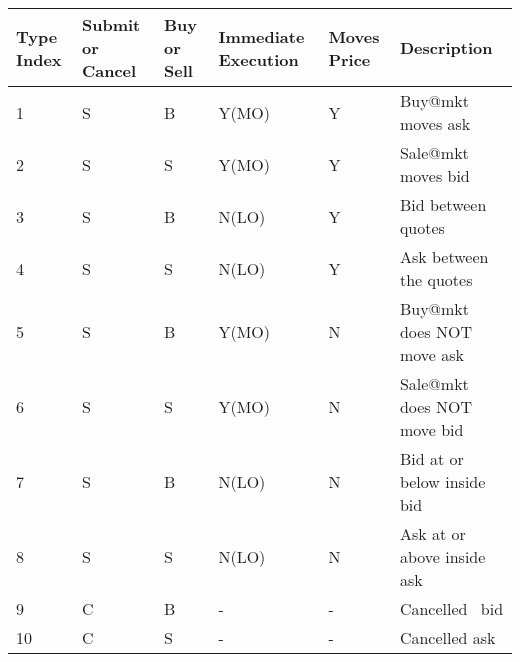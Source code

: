 \documentclass{article}
\begin{document}
\begin{tabular}{|l|l|l|l|l|l|}
  \hline
  Type Index & Submit or Cancel & Buy or Sell & Immediate Execution & Moves
  Price & Description\\
  \hline
  1 & S & B & Y(MO) & Y & Buy@mkt moves ask\\
  \hline
  2 & S & S & Y(MO) & Y & Sale@mkt moves bid\\
  \hline
  3 & S & B & N(LO) & Y & Bid between quotes\\
  \hline
  4 & S & S & N(LO) & Y & Ask between the quotes\\
  \hline
  5 & S & B & Y(MO) & N & Buy@mkt does NOT move ask\\
  \hline
  6 & S & S & Y(MO) & N & Sale@mkt does NOT move bid\\
  \hline
  7 & S & B & N(LO) & N & Bid at or below inside bid\\
  \hline
  8 & S & S & N(LO) & N & Ask at or above inside ask\\
  \hline
  9 & C & B & - & - & Cancelled \ bid\\
  \hline
  10 & C & S & - & - & Cancelled ask\\
  \hline
\end{tabular}

\
\end{document}
